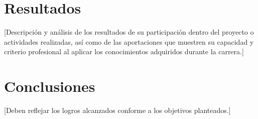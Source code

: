 \documentclass[12pt]{caltech_thesis}
\begin{document}

\chapter{Resultados}

[Descripción y análisis de los resultados de su participación dentro del proyecto o actividades realizadas, así como de las aportaciones que muestren su capacidad y criterio profesional al aplicar los conocimientos adquiridos durante la carrera.]


\chapter{Conclusiones}

[Deben reflejar los logros alcanzados conforme a los objetivos planteados.]


\printbibliography[heading=bibintoc]


\appendix

\end{document}
